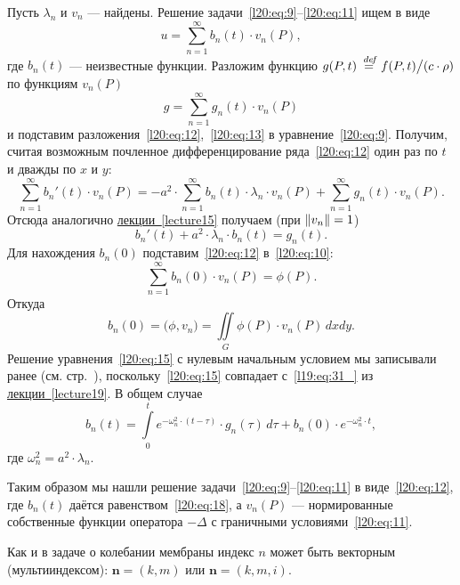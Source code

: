 Пусть $\lambda_n$ и $v_n$ --- найдены. Решение задачи~\eqref{l20:eq:9}--\eqref{l20:eq:11} ищем в виде
\begin{equation}\label{l20:eq:12}
	u=\sum\limits_{n=1}^{\infty}b_n(t)\cdot v_n(P),
\end{equation} 
где $b_n(t)$ --- неизвестные функции. Разложим функцию $g(P,t)\?\eqdef f(P,t)\big/(c\cdot\rho)$ по функциям $v_n(P)$
\begin{equation}\label{l20:eq:13}
	g=\sum\limits_{n=1}^{\infty} g_n(t)\cdot v_n(P)
\end{equation}
и подставим разложения~\eqref{l20:eq:12},~\eqref{l20:eq:13} в уравнение~\eqref{l20:eq:9}. Получим, считая возможным почленное дифференцирование ряда~\eqref{l20:eq:12} один раз по $t$ и дважды по $x$ и $y$:
\begin{equation}\label{l20:eq:14}
	\sum _{n=1}^{\infty } b_{n} '( t) \cdot v_{n}( P) =-a^{2} \cdot \sum _{n=1}^{\infty } b_{n}( t) \cdot \lambda _{n} \cdot v_{n}( P) +\sum _{n=1}^{\infty } g_{n}( t) \cdot v_{n}( P).
\end{equation}
Отсюда аналогично \hyperref[lecture15]{лекции~\ref{lecture15}} получаем (при $\left\|v_n\right\|=1$)
\begin{equation}\label{l20:eq:15}
	b_n'(t)+a^2\cdot\lambda_n\cdot b_n(t)=g_n(t).
\end{equation}
Для нахождения $b_n(0)$ подставим~\eqref{l20:eq:12} в~\eqref{l20:eq:10}:
\begin{equation}\label{l20:eq:16}
	\sum_{n=1}^{\infty}b_n(0)\cdot v_n(P)=\phi(P).
\end{equation}
Откуда
\begin{equation}\label{l20:eq:17}
	b_n(0)=\big(\phi, v_n\big)=\iint\limits_{G}\phi(P)\cdot v_n(P)\,dxdy.
\end{equation}
Решение уравнения~\eqref{l20:eq:15} с нулевым начальным условием мы записывали ранее (см. стр.~\pageref{l19:eq:31_}), поскольку~\eqref{l20:eq:15} совпадает с~\eqref{l19:eq:31_} из \hyperref[lecture19]{лекции~\ref{lecture19}}. В общем случае
\begin{equation}\label{l20:eq:18}
	b_n(t)=\int\limits_0^t e^{-\omega_n^2\cdot(t-\tau)}\cdot g_n(\tau)\,d\tau+b_n(0)\cdot e^{-\omega_n^2\cdot t},
\end{equation}
где $\omega_n^2=a^2\cdot \lambda_n$. 

Таким образом мы нашли решение задачи~\eqref{l20:eq:9}--\eqref{l20:eq:11} в виде~\eqref{l20:eq:12}, где $b_n(t)$ даётся равенством~\eqref{l20:eq:18}, а $v_n(P)$ --- нормированные собственные функции оператора $-\Delta$ с граничными условиями~\eqref{l20:eq:11}.
\begin{_rem}
	Как и в задаче о колебании мембраны индекс $n$ может быть векторным (мультииндексом): $\bm{n}=(k,m)$ или $\bm{n}=(k,m,i)$.
\end{_rem}

